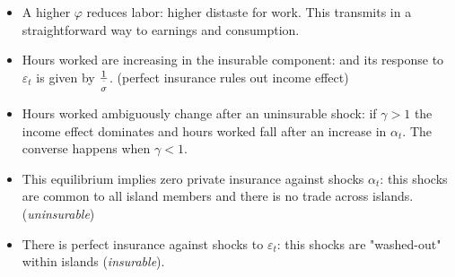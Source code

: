 \documentclass[notes=show]{beamer}
\begin{document}
\bigskip

\begin{frame}%


\begin{itemize}
\item A higher $\varphi $ reduces labor: higher distaste for work. This
transmits in a straightforward way to earnings and consumption.

\item Hours worked are increasing in the insurable component: and its
response to $\varepsilon _{t}$ is given by $\frac{1}{\overset{\symbol{94}}{%
\sigma }}$. (perfect insurance rules out income effect)

\item Hours worked ambiguously change after an uninsurable shock: if $\gamma
>1$ the income effect dominates and hours worked fall after an increase in $%
\alpha _{t}$. The converse happens when $\gamma <1$.
\end{itemize}

\transboxout%
\end{frame}%

\bigskip

\begin{frame}%


\begin{itemize}
\item This equilibrium implies zero private insurance against shocks $\alpha
_{t}$: this shocks are common to all island members and there is no trade
across islands. (\textit{uninsurable})

\item There is perfect insurance against shocks to $\varepsilon _{t}$: this
shocks are "washed-out" within islands (\textit{insurable}).
\end{itemize}

\transboxout%
\end{frame}%
\end{document}
